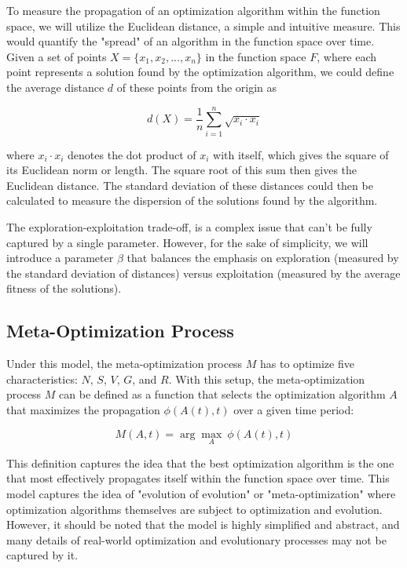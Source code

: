 \documentclass{article}[10pt]
\begin{document}
To measure the propagation of an optimization algorithm within the function space, we will utilize the Euclidean distance, a simple and intuitive measure. 
This would quantify the "spread" of an algorithm in the function space over time.
Given a set of points \( X = \{x_1, x_2, ..., x_n\} \) in the function space \( F \), where each point represents a solution found by the optimization algorithm, we could define the average distance \( d \) of these points from the origin as

\[
d(X) = \frac{1}{n} \sum_{i=1}^{n} \sqrt{x_i \cdot x_i}
\]

\noindent where \( x_i \cdot x_i \) denotes the dot product of \( x_i \) with itself, which gives the square of its Euclidean norm or length. 
The square root of this sum then gives the Euclidean distance.
The standard deviation of these distances could then be calculated to measure the dispersion of the solutions found by the algorithm.\par

The exploration-exploitation trade-off, is a complex issue that can't be fully captured by a single parameter. 
However, for the sake of simplicity, we will introduce a parameter \( \beta \) that balances the emphasis on exploration (measured by the standard deviation of distances) versus exploitation (measured by the average fitness of the solutions).\par




\subsection{Meta-Optimization Process}
\label{subsection:metaOptimization}
Under this model, the meta-optimization process \( M \) has to optimize five characteristics: \( N \), \( S \), \( V \), \( G \), and \( R \). 
With this setup, the meta-optimization process \( M \) can be defined as a function that selects the optimization algorithm \( A \) that maximizes the propagation \( \phi(A(t), t) \) over a given time period:

\[
M(A, t) = \arg\max_{A} \ \phi(A(t), t)
\]

This definition captures the idea that the best optimization algorithm is the one that most effectively propagates itself within the function space over time.
This model captures the idea of "evolution of evolution" or "meta-optimization" where optimization algorithms themselves are subject to optimization and evolution. 
However, it should be noted that the model is highly simplified and abstract, and many details of real-world optimization and evolutionary processes may not be captured by it.\par
\end{document}
